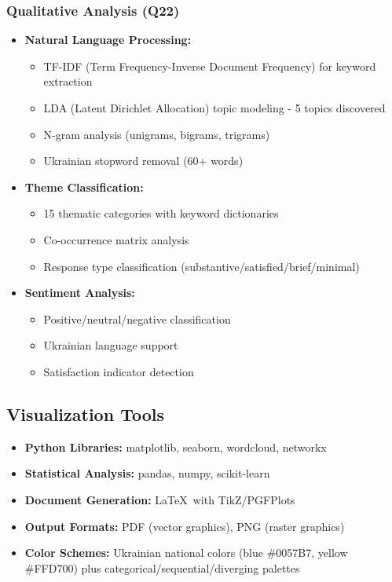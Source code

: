 \documentclass[11pt,a4paper]{article}
\begin{document}
\subsubsection{Qualitative Analysis (Q22)}
\begin{itemize}
    \item \textbf{Natural Language Processing:}
    \begin{itemize}
        \item TF-IDF (Term Frequency-Inverse Document Frequency) for keyword extraction
        \item LDA (Latent Dirichlet Allocation) topic modeling - 5 topics discovered
        \item N-gram analysis (unigrams, bigrams, trigrams)
        \item Ukrainian stopword removal (60+ words)
    \end{itemize}

    \item \textbf{Theme Classification:}
    \begin{itemize}
        \item 15 thematic categories with keyword dictionaries
        \item Co-occurrence matrix analysis
        \item Response type classification (substantive/satisfied/brief/minimal)
    \end{itemize}

    \item \textbf{Sentiment Analysis:}
    \begin{itemize}
        \item Positive/neutral/negative classification
        \item Ukrainian language support
        \item Satisfaction indicator detection
    \end{itemize}
\end{itemize}

\subsection{Visualization Tools}

\begin{itemize}
    \item \textbf{Python Libraries:} matplotlib, seaborn, wordcloud, networkx
    \item \textbf{Statistical Analysis:} pandas, numpy, scikit-learn
    \item \textbf{Document Generation:} \LaTeX\ with TikZ/PGFPlots
    \item \textbf{Output Formats:} PDF (vector graphics), PNG (raster graphics)
    \item \textbf{Color Schemes:} Ukrainian national colors (blue \#0057B7, yellow \#FFD700) plus categorical/sequential/diverging palettes
\end{itemize}
\end{document}
